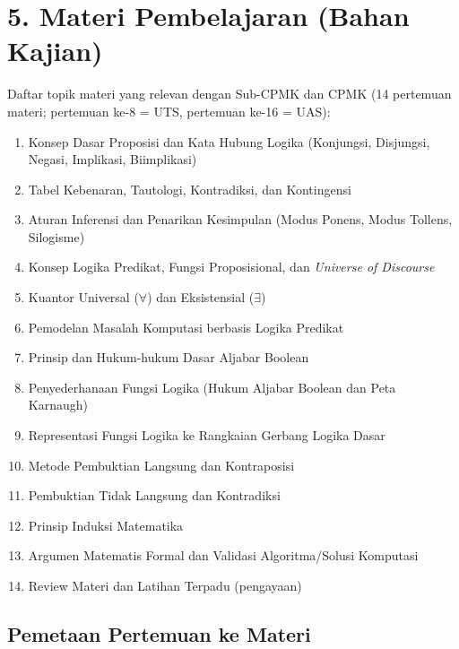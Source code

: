\documentclass[12pt,a4paper]{article}
\begin{document}
\vspace{0.5cm}

\section*{5. Materi Pembelajaran (Bahan Kajian)}

Daftar topik materi yang relevan dengan Sub-CPMK dan CPMK (14 pertemuan materi; pertemuan ke-8 = UTS, pertemuan ke-16 = UAS):

\begin{enumerate}[leftmargin=*]
  \item Konsep Dasar Proposisi dan Kata Hubung Logika (Konjungsi, Disjungsi, Negasi, Implikasi, Biimplikasi)
  \item Tabel Kebenaran, Tautologi, Kontradiksi, dan Kontingensi
  \item Aturan Inferensi dan Penarikan Kesimpulan (Modus Ponens, Modus Tollens, Silogisme)
  \item Konsep Logika Predikat, Fungsi Proposisional, dan \textit{Universe of Discourse}
  \item Kuantor Universal ($\forall$) dan Eksistensial ($\exists$)
  \item Pemodelan Masalah Komputasi berbasis Logika Predikat
  \item Prinsip dan Hukum-hukum Dasar Aljabar Boolean
  \item Penyederhanaan Fungsi Logika (Hukum Aljabar Boolean dan Peta Karnaugh)
  \item Representasi Fungsi Logika ke Rangkaian Gerbang Logika Dasar
  \item Metode Pembuktian Langsung dan Kontraposisi
  \item Pembuktian Tidak Langsung dan Kontradiksi
  \item Prinsip Induksi Matematika
  \item Argumen Matematis Formal dan Validasi Algoritma/Solusi Komputasi
  \item Review Materi dan Latihan Terpadu (pengayaan)
\end{enumerate}

\subsection*{Pemetaan Pertemuan ke Materi}
\end{document}
